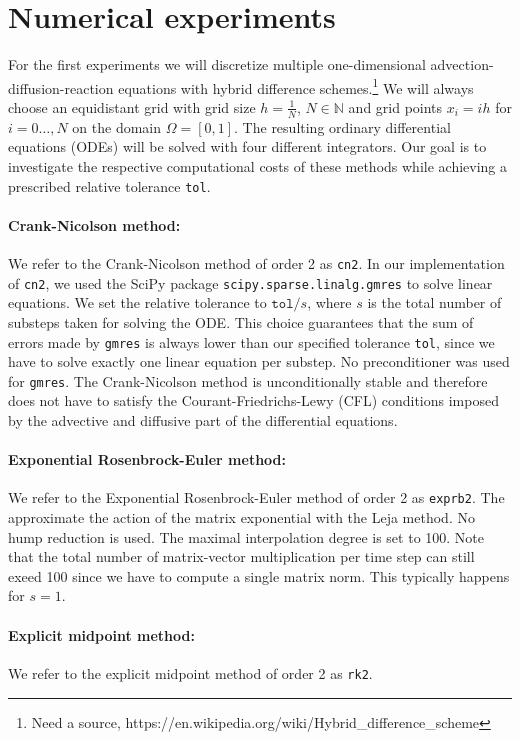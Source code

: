 \documentclass{scrartcl}
\begin{document}
\section{Numerical experiments}\label{sec:NE}
For the first experiments we will discretize multiple one-dimensional advection-diffusion-reaction equations with hybrid difference schemes.\footnote{Need a source, https://en.wikipedia.org/wiki/Hybrid\_difference\_scheme} We will always choose an equidistant grid with grid size $h = \frac{1}{N}$, $N\in\mathbb{N}$ and grid points $x_i = ih$ for $i=0\dots,N$ on the domain $\Omega = [0,1]$. The resulting ordinary differential equations (ODEs) will be solved with four different integrators. Our goal is to investigate the respective computational costs of these methods while achieving a prescribed relative tolerance \texttt{tol}.

\paragraph{Crank-Nicolson method:}
We refer to the Crank-Nicolson method of order 2 as \texttt{cn2}. 
In our implementation of \texttt{cn2}, we used the SciPy\cite{scipy} package \texttt{scipy.sparse.linalg.gmres} to solve linear equations. We set the relative tolerance to $\texttt{tol}/s$, where $s$ is the total number of substeps taken for solving the ODE. This choice guarantees that the sum of errors made by \texttt{gmres} is always lower than our specified tolerance \texttt{tol}, since we have to solve exactly one linear equation per substep. No preconditioner was used for \texttt{gmres}. The Crank-Nicolson method is unconditionally stable and therefore does not have to satisfy the Courant-Friedrichs-Lewy (CFL) conditions imposed by the advective and diffusive part of the differential equations.

\paragraph{Exponential Rosenbrock-Euler method:}
We refer to the Exponential Rosenbrock-Euler method of order 2 as \texttt{exprb2}.
The approximate the action of the matrix exponential with the Leja method. No hump reduction is used. The maximal interpolation degree is set to 100. Note that the total number of matrix-vector multiplication per time step can still exeed 100 since we have to compute a single matrix norm. This typically happens for $s=1$. 

\paragraph{Explicit midpoint method:}
We refer to the explicit midpoint method of order 2 as \texttt{rk2}. 
\end{document}
